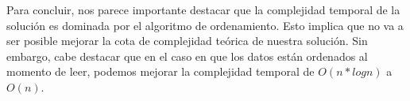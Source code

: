 Para concluir, nos parece importante destacar que la complejidad temporal de la solución es dominada por el algoritmo de ordenamiento. Esto implica que no va a ser posible mejorar la cota de complejidad teórica de nuestra solución. Sin embargo, cabe destacar que en el caso en que los datos están ordenados al momento de leer, podemos mejorar la complejidad temporal de $O(n * log n)$ a $O(n)$.